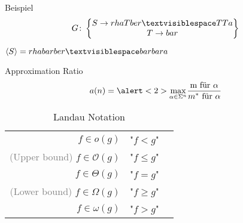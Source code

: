 \begin{frame}{\FrameName}
\begin{block}{Beispiel}
	$$
	G \colon \begin{Bmatrix} 
		S \rightarrow rhaTber \textvisiblespace TTa \\
		T \rightarrow bar
	\end{Bmatrix}
	$$
	
	$\langle S \rangle = rhabarber \textvisiblespace barbara$ 
	\visible<2->{ \linebreak $| \langle S \rangle| = 17$}
	\visible<3->{ \linebreak $\lvert G \lvert = 11$}
\end{block}
\end{frame}

\begin{frame}{\FrameName}
\begin{block}{Approximation Ratio}
	\Gap
	$$
	a(n) = \alert<2>{\max\limits_{\alpha \in \Sigma^n}}\frac{
		\textrm{m für $\alpha$}
	}{
		\textrm{$m^*$ für $\alpha$}
	}
	$$
	
\end{block}
\end{frame}

\begin{frame}{\FrameName}
\begin{table}
	\caption{Landau Notation}
	\begin{tabular}{ r p{3.5cm} l}
		
		$f \in o(g)$ & "$f < g$" \\
		\textcolor{gray}{(Upper bound)} $f \in \mathcal{O}(g)$ & "$f\leq g$" \\
		$f \in \Theta(g)$ & "$f = g$"\\
		\textcolor{gray}{(Lower bound)} $f \in \Omega(g)$ & "$f \geq g$"\\
		$f \in \omega(g)$ & "$f > g$"\\
	\end{tabular}
\end{table}
\end{frame}